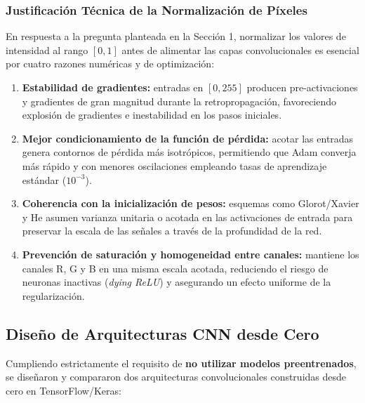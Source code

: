 \subsubsection{Justificación Técnica de la Normalización de Píxeles}
En respuesta a la pregunta planteada en la Sección 1, normalizar los valores de intensidad al rango $[0, 1]$ antes de alimentar las capas convolucionales es esencial por cuatro razones numéricas y de optimización:
\begin{enumerate}
    \item \textbf{Estabilidad de gradientes:} entradas en $[0, 255]$ producen pre-activaciones y gradientes de gran magnitud durante la retropropagación, favoreciendo explosión de gradientes e inestabilidad en los pasos iniciales.
    \item \textbf{Mejor condicionamiento de la función de pérdida:} acotar las entradas genera contornos de pérdida más isotrópicos, permitiendo que Adam converja más rápido y con menores oscilaciones empleando tasas de aprendizaje estándar ($10^{-3}$).
    \item \textbf{Coherencia con la inicialización de pesos:} esquemas como Glorot/Xavier y He \cite{He2015} asumen varianza unitaria o acotada en las activaciones de entrada para preservar la escala de las señales a través de la profundidad de la red.
    \item \textbf{Prevención de saturación y homogeneidad entre canales:} mantiene los canales R, G y B en una misma escala acotada, reduciendo el riesgo de neuronas inactivas (\textit{dying ReLU}) y asegurando un efecto uniforme de la regularización.
\end{enumerate}

\subsection{Diseño de Arquitecturas CNN desde Cero}

Cumpliendo estrictamente el requisito de \textbf{no utilizar modelos preentrenados}, se diseñaron y compararon dos arquitecturas convolucionales construidas desde cero en TensorFlow/Keras:

